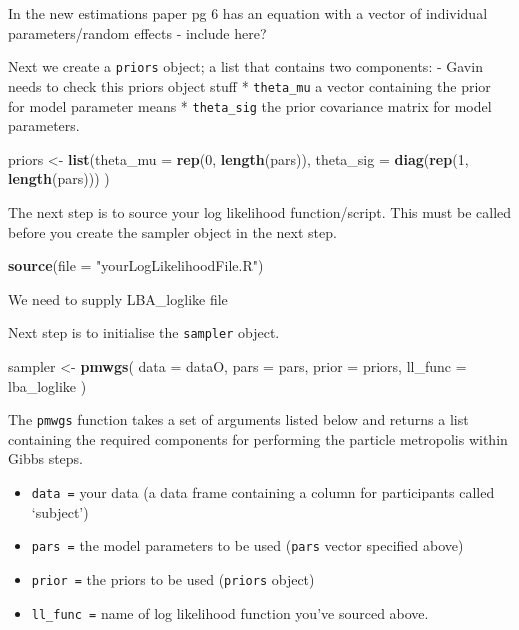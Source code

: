 \documentclass[]{book}
\newenvironment{Shaded}{\begin{snugshade}}{\end{snugshade}}
\newcommand{\KeywordTok}[1]{\textcolor[rgb]{0.13,0.29,0.53}{\textbf{#1}}}
\newcommand{\DataTypeTok}[1]{\textcolor[rgb]{0.13,0.29,0.53}{#1}}
\newcommand{\DecValTok}[1]{\textcolor[rgb]{0.00,0.00,0.81}{#1}}
\newcommand{\StringTok}[1]{\textcolor[rgb]{0.31,0.60,0.02}{#1}}
\newcommand{\NormalTok}[1]{#1}
\providecommand{\tightlist}{%
  \setlength{\itemsep}{0pt}\setlength{\parskip}{0pt}}
\begin{document}
In the new estimations paper pg 6 has an equation with a vector of
individual parameters/random effects - include here?

Next we create a \texttt{priors} object; a list that contains two
components: - Gavin needs to check this priors object stuff *
\texttt{theta\_mu} a vector containing the prior for model parameter
means * \texttt{theta\_sig} the prior covariance matrix for model
parameters.

\begin{Shaded}
\begin{Highlighting}[]
\NormalTok{priors <-}\StringTok{ }\KeywordTok{list}\NormalTok{(}\DataTypeTok{theta_mu =} \KeywordTok{rep}\NormalTok{(}\DecValTok{0}\NormalTok{, }\KeywordTok{length}\NormalTok{(pars)),}
  \DataTypeTok{theta_sig =} \KeywordTok{diag}\NormalTok{(}\KeywordTok{rep}\NormalTok{(}\DecValTok{1}\NormalTok{, }\KeywordTok{length}\NormalTok{(pars)))}
\NormalTok{)}
\end{Highlighting}
\end{Shaded}

The next step is to source your log likelihood function/script. This
must be called before you create the sampler object in the next step.

\begin{Shaded}
\begin{Highlighting}[]
\KeywordTok{source}\NormalTok{(}\DataTypeTok{file =} \StringTok{"yourLogLikelihoodFile.R"}\NormalTok{)}
\end{Highlighting}
\end{Shaded}

We need to supply LBA\_loglike file

Next step is to initialise the \texttt{sampler} object.

\begin{Shaded}
\begin{Highlighting}[]
\NormalTok{sampler <-}\StringTok{ }\KeywordTok{pmwgs}\NormalTok{(}
  \DataTypeTok{data =}\NormalTok{ dataO,}
  \DataTypeTok{pars =}\NormalTok{ pars,}
  \DataTypeTok{prior =}\NormalTok{ priors,}
  \DataTypeTok{ll_func =}\NormalTok{ lba_loglike}
\NormalTok{)}
\end{Highlighting}
\end{Shaded}

The \texttt{pmwgs} function takes a set of arguments listed below and
returns a list containing the required components for performing the
particle metropolis within Gibbs steps.

\begin{itemize}
\tightlist
\item
  \texttt{data\ =} your data (a data frame containing a column for
  participants called `subject')
\item
  \texttt{pars\ =} the model parameters to be used (\texttt{pars} vector
  specified above)
\item
  \texttt{prior\ =} the priors to be used (\texttt{priors} object)
\item
  \texttt{ll\_func\ =} name of log likelihood function you've sourced
  above.
\end{itemize}
\end{document}
